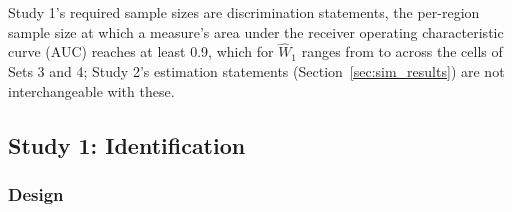 \documentclass[AMA,Times1COL]{WileyNJDv5}
\begin{document}
Study 1's required sample sizes are discrimination statements, the per-region sample size at which a measure's area under the receiver operating characteristic curve (AUC) reaches at least 0.9, which for $\widehat{W}_1$ ranges from  to  across the cells of Sets 3 and 4; Study 2's estimation statements (Section~\ref{sec:sim_results}) are not interchangeable with these.

\subsection{Study 1: Identification}\label{sec:study1}


\subsubsection{Design}\label{sec:study1_design}
\end{document}
